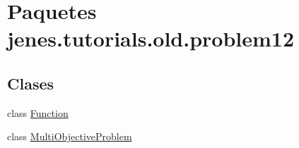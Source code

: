 \hypertarget{namespacejenes_1_1tutorials_1_1old_1_1problem12}{\section{Paquetes jenes.\-tutorials.\-old.\-problem12}
\label{namespacejenes_1_1tutorials_1_1old_1_1problem12}
}
\subsection*{Clases}
\begin{DoxyCompactItemize}
\item 
class \hyperlink{classjenes_1_1tutorials_1_1old_1_1problem12_1_1_function}{Function}
\item 
class \hyperlink{classjenes_1_1tutorials_1_1old_1_1problem12_1_1_multi_objective_problem}{Multi\-Objective\-Problem}
\end{DoxyCompactItemize}
